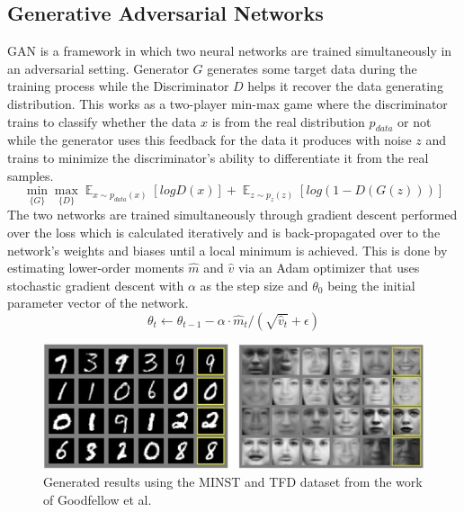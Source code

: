 \documentclass{Configuration_Files/PoliMi3i_thesis}
\begin{document}
\subsection{Generative Adversarial Networks}
GAN is a framework in which two neural networks are trained simultaneously in an 
adversarial setting. Generator $G$ generates some target data during the training 
process while the Discriminator $D$ helps it recover the data generating distribution. 
This works as a two-player min-max game \cite{IaG14} where the discriminator trains to 
classify whether the data $x$ is from the real distribution $p_{data}$ or not while the 
generator uses this feedback for the data it produces with noise $z$ and trains to 
minimize the discriminator’s ability to differentiate it from the real samples.
\begin{equation} \label{eq:ganminmax}
\min_{\{G\}}\max_{\{D\}} \mathop{{}\mathbb{E}}_{x\sim p_{data}(x)}[logD(x)]+ \mathop{{}\mathbb{E}}_{z\sim p_{z}(z)}[log(1-D(G(z)))]
\end{equation}
The two networks are trained simultaneously through gradient descent performed
over the loss which is calculated iteratively and is back-propagated over to the
network’s weights and biases until a local minimum is achieved. This is done by 
estimating lower-order moments $\hat{m}$ and $\hat{v}$ via an Adam optimizer that uses 
stochastic gradient descent with $\alpha$ as the step size and $\theta_{0}$ being the initial parameter 
vector of the network.
\begin{equation} \label{eq:ganopt}
\theta_{t}\leftarrow \theta_{t-1} - \alpha \cdot \hat{m}_{t}/(\sqrt{\hat{v}_{t}} + \epsilon)
\end{equation}
\begin{figure}[H]
    \centering
    \includegraphics[width=1\textwidth]{gan_results.jpg}
    \caption[Generated numbers and faces from the work of Goodfellow et al.]{Generated results using the MINST and TFD dataset from the work of Goodfellow et al.}
    \label{fig:ganresults}
\end{figure}
\end{document}
